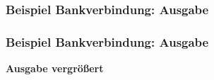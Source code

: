 \documentclass[12pt,ngerman]{beamer}
\begin{document}
\begin{frame}[containsverbatim]
\frametitle{Beispiel Bankverbindung: Ausgabe}

\begin{center}
\end{center}

\end{frame}

\begin{frame}[containsverbatim]
\frametitle{Beispiel Bankverbindung: Ausgabe}

\textbf{Ausgabe vergrößert}

\begin{center}
\end{center}

\end{frame}
\end{document}
